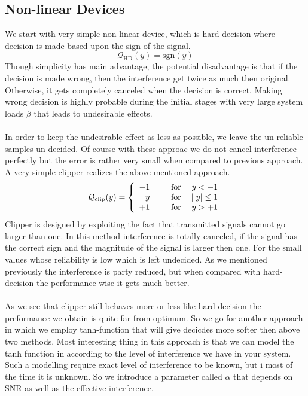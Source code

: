 \subsection{Non-linear Devices}
We start with very simple non-linear device, which is hard-decision where decision is made based upon the sign of the signal.
\begin{equation}
\mathcal{Q}_{\mathrm{HD}}(y)=\mathrm{sgn}(y)
\end{equation}
Though simplicity has main advantage, the potential disadvantage is that if the decision is made wrong, then the interference get twice as much then original. Otherwise, it gets completely canceled when the decision is correct. Making wrong decision is highly probable during the initial stages with very large system loads $\beta$ that leads to undesirable effects. \\ \\
In order to keep the undesirable effect as less as possible, we leave the un-reliable samples un-decided. Of-course with these approac we do not cancel interference perfectly but the error is rather very small when compared to previous approach. A very simple clipper realizes the above mentioned approach.
\begin{eqnarray}
\mathcal{Q}_{\mathrm{clip}}(y)=\left\{
\begin{array}{rllr}
-1&\hspace{2mm}&\mathrm{for}&\;y < -1 \\ 
 y&\hspace{2mm}&\mathrm{for}&\vert\; y \vert \leq 1 \\ 
+1&\hspace{2mm}&\mathrm{for}&\;y > +1
\end{array}
\right.
\end{eqnarray}
Clipper is designed by exploiting the fact that transmitted signals cannot go larger than one. In this method interference is totally canceled, if the signal has the correct sign and the magnitude of the signal is larger then one. For the small values whose reliability is low which is left undecided. As we mentioned previously the interference is party reduced, but when compared with hard-decision the performance wise it gets much better.\\ \\
As we see that clipper still behaves more or less like hard-decision the preformance we obtain is quite far from optimum. So we go for another approach in which we employ tanh-function that will give decicdes more softer then above two methods. Most interesting thing in this approach is that we can model the tanh function in according to the level of interference we have in your system. Such a modelling require exact level of interference to be known, but i most of the time it is unknown. So we introduce a parameter called $\alpha$ that depends on SNR as well as the effective interference.
